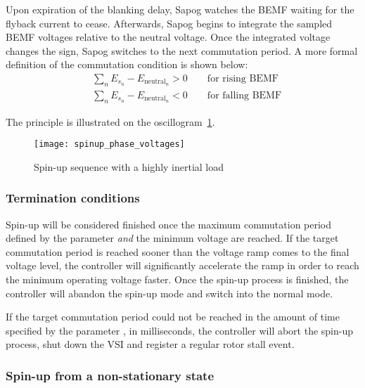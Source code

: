 \documentclass{zubaxdoc}
\begin{document}
	Upon expiration of the blanking delay, Sapog watches the BEMF waiting for the flyback current to cease.
	Afterwards, Sapog begins to integrate the sampled BEMF voltages relative to the neutral voltage.
	Once the integrated voltage changes the sign, Sapog switches to the next commutation period.
	A more formal definition of the commutation condition is shown below:
	\begin{equation}
		\begin{aligned}
			&\sum_{n} E_{s_n} - E_{\text{neutral}_n} > 0 \qquad\text{for rising BEMF}\\
			&\sum_{n} E_{s_n} - E_{\text{neutral}_n} < 0 \qquad\text{for falling BEMF}
		\end{aligned}
	\end{equation}
	
	The principle is illustrated on the oscillogram~\ref{spinup_phase_voltages}.
	
	\begin{figure}[hbt]
		\centering
		\texttt{[image: spinup\_phase\_voltages]}
		\caption{Spin-up sequence with a highly inertial load
			\label{spinup_phase_voltages}}
	\end{figure}
	
	\subsubsection{Termination conditions}
	
	Spin-up will be considered finished once the maximum commutation period defined by the parameter
	 \emph{and} the minimum voltage  are reached.
	If the target commutation period is reached sooner than the voltage ramp comes to the final
	voltage level, the controller will significantly accelerate the ramp in order to reach
	the minimum operating voltage faster.
	Once the spin-up process is finished,
	the controller will abandon the spin-up mode and switch into the normal mode.
	
	If the target commutation period could not be reached in the amount of time specified by
	the parameter , in milliseconds, the controller will abort the spin-up process,
	shut down the VSI and register a regular rotor stall event.
	
	\subsubsection{Spin-up from a non-stationary state}
	
\end{document}
